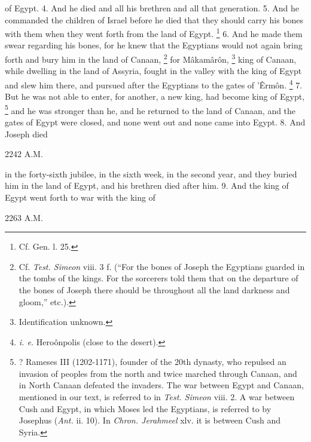 of Egypt. 4. And he died and all his brethren and all that generation. 5. And he commanded the children of Israel before he died that they should carry his bones with them when they went forth from the land of Egypt. \footnote{Cf. Gen. l. 25.} 6. And he made them swear regarding his bones, for he knew that the Egyptians would not again bring forth and bury him in the land of Canaan, \footnote{Cf. \emph{Test. Simeon} viii. 3 f. (``For the bones of Joseph the Egyptians guarded in the tombs of the kings. For the sorcerers told them that on the departure of the bones of Joseph there should be throughout all the land darkness and gloom,'' etc.).} for Mâkamârôn, \footnote{Identification unknown.} king of Canaan, while dwelling in the land of Assyria, fought in the valley with the king of Egypt and slew him there, and pursued after the Egyptians to the gates of ’Êrmôn. \footnote{\emph{i. e.} Heroônpolis (close to the desert).} 7. But he was not able to enter, for another, a new king, had become king of Egypt, \footnote{? Rameses III (1202-1171), founder of the 20th dynasty, who repulsed an invasion of peoples from the north and twice marched through Canaan, and in North Canaan defeated the invaders. The war between Egypt and Canaan, mentioned in our text, is referred to in \emph{Test. Simeon} viii. 2. A war between Cush and Egypt, in which Moses led the Egyptians, is referred to by Josephus (\emph{Ant.} ii. 10). In \emph{Chron. Jerahmeel} xlv. it is between Cush and Syria.} and he was stronger than he, and he returned to the land of Canaan, and the gates of Egypt were closed, and none went out and none came into Egypt. 8. And Joseph died

2242 A.M.

in the forty-sixth jubilee, in the sixth week, in the second year, and they buried him in the land of Egypt, and his brethren died after him. 9. And the king of Egypt went forth to war with the king of

2263 A.M.

